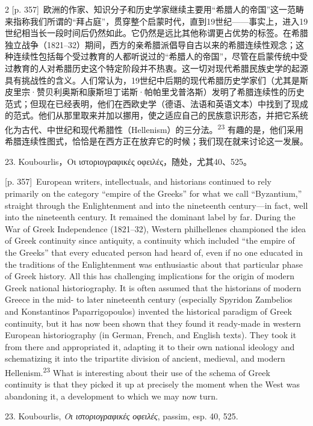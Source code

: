 \documentclass[10pt,a4paper]{article}
\begin{document}
\begin{paracol}{2}
{\scriptsize\color{gray}[p. 357]}\ 欧洲的作家、知识分子和历史学家继续主要用“希腊人的帝国”这一范畴来指称我们所谓的“拜占庭”，贯穿整个启蒙时代，直到19世纪——事实上，进入19世纪相当长一段时间后仍然如此。它仍然是远比其他称谓更占优势的标签。在希腊独立战争（1821–32）期间，西方的亲希腊派倡导自古以来的希腊连续性观念；这种连续性包括每个受过教育的人都听说过的“希腊人的帝国”，尽管在启蒙传统中受过教育的人对希腊历史这个特定阶段并不热衷。这一切对现代希腊民族史学的起源具有挑战性的含义。人们常认为，19世纪中后期的现代希腊历史学家们（尤其是斯皮里宗·赞贝利奥斯和康斯坦丁诺斯·帕帕里戈普洛斯）发明了希腊连续性的历史范式；但现在已经表明，他们在西欧史学（德语、法语和英语文本）中找到了现成的范式。他们从那里取来并加以挪用，使之适应自己的民族意识形态，并把它系统化为古代、中世纪和现代希腊性（Hellenism）的三分法。\nobreak\textsuperscript{23} 有趣的是，他们采用希腊连续性图式，恰恰是在西方正在放弃它的时候；我们现在就来讨论这一发展。\par{\small 23. Koubourlis，Οι ιστοριογραφικές οφειλές，随处，尤其40、525。\par}
\switchcolumn
{\scriptsize\color{gray}[p. 357]}\ European writers, intellectuals, and historians continued to rely primarily on the category “empire of the Greeks” for what we call “Byzantium,” straight through the Enlightenment and into the nineteenth century—in fact, well into the nineteenth century. It remained the dominant label by far. During the War of Greek Independence (1821–32), Western philhellenes championed the idea of Greek continuity since antiquity, a continuity which included “the empire of the Greeks” that every educated person had heard of, even if no one educated in the traditions of the Enlightenment was enthusiastic about that particular phase of Greek history. All this has challenging implications for the origin of modern Greek national historiography. It is often assumed that the historians of modern Greece in the mid- to later nineteenth century (especially Spyridon Zambelios and Konstantinos Paparrigopoulos) invented the historical paradigm of Greek continuity, but it has now been shown that they found it ready-made in western European historiography (in German, French, and English texts). They took it from there and appropriated it, adapting it to their own national ideology and schematizing it into the tripartite division of ancient, medieval, and modern Hellenism.\nobreak\textsuperscript{23} What is interesting about their use of the schema of Greek continuity is that they picked it up at precisely the moment when the West was abandoning it, a development to which we may now turn.\par{\small 23. Koubourlis, \textit{Οι ιστοριογραφικές οφειλές}, passim, esp. 40, 525.\par}

\end{paracol}
\end{document}
